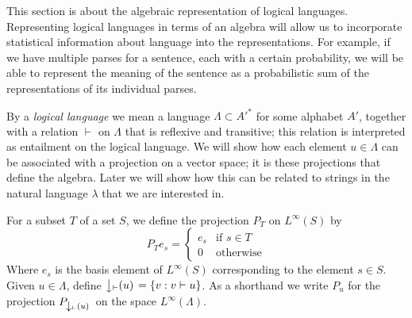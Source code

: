 
This section is about the algebraic representation of logical languages. Representing logical languages in terms of an algebra will allow us to incorporate statistical information about language into the representations. For example, if we have multiple parses for a sentence, each with a certain probability, we will be able to represent the meaning of the sentence as a probabilistic sum of the representations of its individual parses.

By a \emph{logical language} we mean a language $\Lambda \subset {A'}^*$ for some alphabet $A'$, together with a relation $\vdash$ on $\Lambda$ that is reflexive and transitive; this relation is interpreted as entailment on the logical language. We will show how each element $u \in \Lambda$ can be associated with a projection on a vector space; it is these projections that define the algebra. Later we will show how this can be related to strings in the natural language $\lambda$ that we are interested in.

For a subset $T$ of a set $S$, we define the projection $P_T$ on $L^\infty(S)$ by 
$$P_T e_s = \left\{
\begin{array}{ll}
e_s & \text{if $s \in T$}\\
0 & \text{otherwise}
\end{array}
 \right.$$
 Where $e_s$ is the basis element of $L^{\infty}(S)$ corresponding to the element $s\in S$.
Given $u \in \Lambda$, define $\left\downarrow_\vdash(u)\right. = \{v : v \vdash u\}$. As a shorthand we write $P_u$ for the projection $P_{\left\downarrow_\vdash(u)\right.}$ on the space $L^\infty(\Lambda)$.


